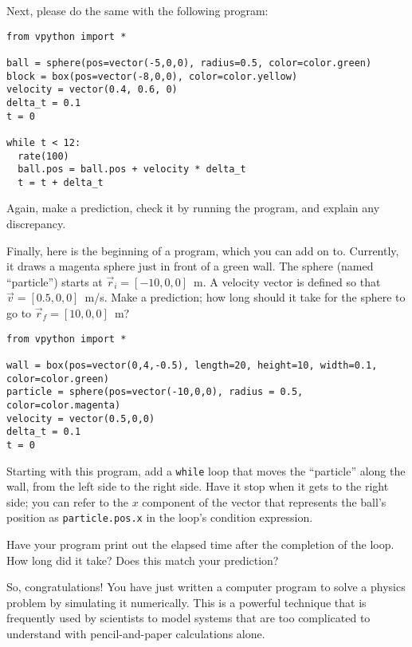 \documentclass[11pt]{article}
\begin{document}
\noindent Next, please do the same with the following program:
{\small{
\begin{verbatim}
from vpython import *

ball = sphere(pos=vector(-5,0,0), radius=0.5, color=color.green)
block = box(pos=vector(-8,0,0), color=color.yellow)
velocity = vector(0.4, 0.6, 0)
delta_t = 0.1
t = 0

while t < 12:
  rate(100)
  ball.pos = ball.pos + velocity * delta_t
  t = t + delta_t
\end{verbatim}
}}
\noindent Again, make a prediction, check it by running the program, and explain
any discrepancy.

Finally, here is the beginning of a program, which you can add on to.
Currently, it draws a magenta sphere just in front of a green wall.
The sphere (named ``particle'') starts at $\vec{r}_i = [-10, 0, 0]$~m.  
A velocity vector is defined so that $\vec{v} = [0.5, 0, 0]$~m/s.
Make a prediction; how long should it take for the sphere to go to
$\vec{r}_f = [10, 0, 0]$~m?

{\small{
\begin{verbatim}
from vpython import *

wall = box(pos=vector(0,4,-0.5), length=20, height=10, width=0.1, color=color.green)
particle = sphere(pos=vector(-10,0,0), radius = 0.5, color=color.magenta)
velocity = vector(0.5,0,0)
delta_t = 0.1
t = 0
\end{verbatim}
}}
Starting with this program, add a {\texttt {while}} loop that moves the ``particle''  
along the wall, from the left side to the right side.  Have it stop when it 
gets to the right side; you can refer to the $x$ component of the vector that 
represents the ball's position as {\texttt {particle.pos.x}} in the loop's 
condition expression. 

Have your program print out the elapsed time after the completion of the
loop.  How long did it take?  Does this match your prediction?

So, congratulations!  You have just written a computer program to solve
a physics problem by simulating it numerically.  This is a powerful technique 
that is frequently used by scientists to model systems that are too 
complicated to understand with pencil-and-paper calculations alone.
\end{document}

